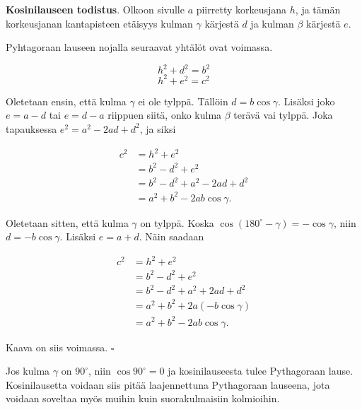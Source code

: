 \textbf{Kosinilauseen todistus}. Olkoon sivulle $a$ piirretty korkeusjana $h$, ja tämän
korkeusjanan kantapisteen etäisyys kulman $\gamma$ kärjestä $d$ ja kulman $\beta$ kärjestä $e$.



Pyhtagoraan lauseen nojalla seuraavat yhtälöt ovat voimassa.

\[
h^2 + d^2 = b^2
\]
\[
h^2 + e^2 = c^2
\]

Oletetaan ensin, että kulma $\gamma$ ei ole tylppä. Tällöin $d = b \cos \gamma$.
Lisäksi joko $e = a - d$ tai $e = d - a$ riippuen siitä, onko kulma $\beta$ terävä vai
tylppä. Joka tapauksessa $e^2 = a^2 - 2ad + d^2$, ja siksi

\begin{align*}
c^2 &= h^2 + e^2 \\
&= b^2 - d^2 + e^2 \\
&= b^2 - d^2 + a^2 - 2 a d + d^2 \\
&= a^2 + b^2 - 2 a b \cos \gamma .
\end{align*}

Oletetaan sitten, että kulma $\gamma$ on tylppä. Koska $\cos (180^{\circ} - \gamma )
= - \cos \gamma$, niin $d = -b \cos \gamma$. Lisäksi $e = a + d$. Näin saadaan

\begin{align*}
c^2 &= h^2 + e^2 \\
&= b^2 - d^2 + e^2 \\
&= b^2 - d^2 + a^2 + 2 a d + d^2 \\
&= a^2 + b^2 + 2 a(- b \cos \gamma ) \\
&= a^2 + b^2 - 2 a b \cos \gamma .
\end{align*}

Kaava on siis voimassa. $\square$

Jos kulma $\gamma$ on $90^\circ$, niin $\cos 90^\circ=0$ ja kosinilauseesta tulee Pythagoraan lause. Kosinilausetta voidaan siis pitää laajennettuna Pythagoraan lauseena, jota voidaan soveltaa myös muihin kuin suorakulmaisiin kolmioihin.

